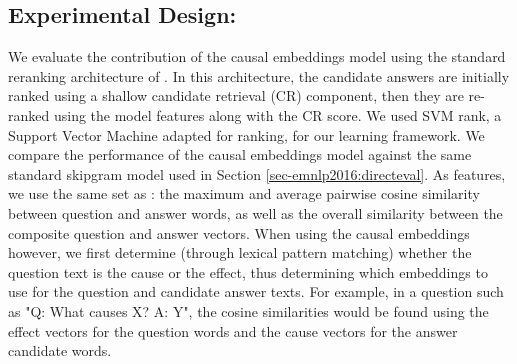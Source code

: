 \subsection{Experimental Design:}
We evaluate the contribution of the causal embeddings model using the standard reranking architecture  of .
In this architecture, the candidate answers are initially ranked using a shallow candidate retrieval (CR) component, then they are re-ranked using the model features along with the CR score. 
We used SVM rank, a Support Vector Machine adapted for ranking, for our learning framework.
We compare the performance of the causal embeddings model against the same standard skipgram model used in Section \ref{sec-emnlp2016:directeval}.
As features, we use the same set as : the maximum and average pairwise cosine similarity between question and answer words, as well as the overall similarity between the composite question and answer vectors.  When using the causal embeddings however, we first determine (through lexical pattern matching) whether the question text is the cause or the effect, thus determining which embeddings to use for the question and candidate answer texts.  For example, in a question such as "Q: What causes X? A: Y", the cosine similarities would be found using the effect vectors for the question words and the cause vectors for the answer candidate words.    

